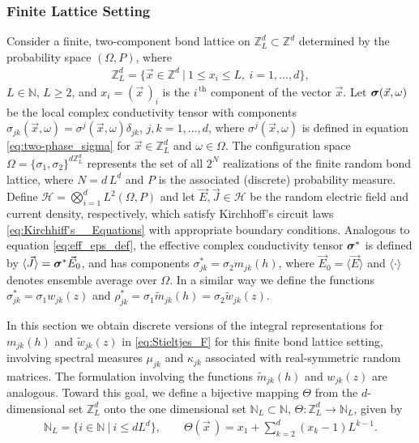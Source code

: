 \documentclass{cmslatex}
\newcommand\bsig{\mbox{\boldmath${\sigma}$}}
\begin{document}
\subsubsection{Finite Lattice Setting}
\label{sec:Finite_Lattice_Setting}
%
Consider a finite, two-component bond lattice on
$\mathbb{Z}_L^d\subset\mathbb{Z}^d$ determined by the probability space
$(\Omega,P)$, where
%
\begin{align}\label{eq:ZLd}
  \mathbb{Z}_L^d=\{\vec{x}\in\mathbb{Z}^d \ | \ 1\leq x_i\leq L, \ i=1,\ldots,d\},   
\end{align}
%
$L\in\mathbb{N}$, $L\geq2$, and $x_i=(\vec{x}\,)_i$ is the $i^{\,\text{th}}$
component of the vector $\vec{x}$. Let $\bsig(\vec{x},\omega)$ be the local
complex conductivity tensor with components
$\sigma_{jk}(\vec{x},\omega)=\sigma^j(\vec{x},\omega)\delta_{jk}$, $j,k=1,\ldots,d$, where
$\sigma^j(\vec{x},\omega)$ is defined in equation \eqref{eq:two-phase_sigma} for
$\vec{x}\in \mathbb{Z}_L^d$ and $\omega\in\Omega$. The configuration space
$\Omega=\{\sigma_1,\sigma_2\}^{d\mathbb{Z}_L^d}$ represents the set of all $2^N$
realizations of the finite random bond lattice, where $N=d\,L^d$ and
$P$ is the associated (discrete) probability measure. Define
$\mathscr{H}=\bigotimes_{i=1}^dL^2(\Omega,P)$ and let
$\vec{E},\vec{J}\in \mathscr{H}$ be the random
electric field and current density, respectively, which satisfy
Kirchhoff's circuit laws \eqref{eq:Kirchhiff's__Equations} with
appropriate boundary conditions. Analogous to equation 
\eqref{eq:eff_eps_def}, the effective complex conductivity tensor
$\bsig^*$ is defined by $\langle\vec{J}\rangle=\bsig^*\vec{E}_0$, and
has components $\sigma_{jk}^*=\sigma_2m_{jk}(h)$, where $\vec{E}_0=\langle\vec{E}\rangle$ and
$\langle\cdot\rangle$ denotes ensemble average over $\Omega$. In a similar way we define
the functions $\sigma_{jk}^*=\sigma_1w_{jk}(z)$ and
$\rho^*_{jk}=\sigma_1\tilde{m}_{jk}(h)=\sigma_2\tilde{w}_{jk}(z)$.  




In this section we obtain discrete versions of the integral
representations for $m_{jk}(h)$ and $\tilde{w}_{jk}(z)$ in
\eqref{eq:Stieltjes_F} for this finite bond lattice setting, involving
spectral measures $\mu_{jk}$ and $\kappa_{jk}$ associated with real-symmetric
random matrices. The formulation involving the functions
$\tilde{m}_{jk}(h)$ and $w_{jk}(z)$ are analogous. Toward this goal,
we define a bijective mapping $\Theta$ from the $d$-dimensional set
$\mathbb{Z}_L^d$ onto the one dimensional set
$\mathbb{N}_L\subset\mathbb{N}$, $\Theta:\mathbb{Z}_L^d\to\mathbb{N}_L$, given by
% 
\begin{align}\label{eq:Bijection_Z_N}
  \mathbb{N}_L=\{i\in\mathbb{N} \ | \ i\leq dL^d\}, \qquad
  \Theta(\vec{x}\,)=x_1+\sum_{k=2}^d(x_k-1)L^{k-1}.
\end{align}
%
\end{document}
